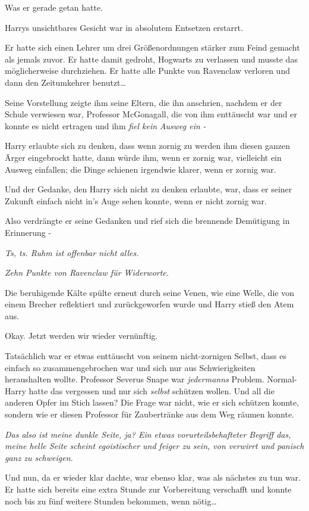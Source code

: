 {Was er gerade getan hatte.

Harrys unsichtbares Gesicht war in absolutem Entsetzen erstarrt.

Er hatte sich einen Lehrer um drei Größenordnungen stärker zum Feind gemacht als jemals zuvor. Er hatte damit gedroht, Hogwarts zu verlassen und musste das möglicherweise durchziehen. Er hatte alle Punkte von Ravenclaw verloren und dann den Zeitumkehrer benutzt…

Seine Vorstellung zeigte ihm seine Eltern, die ihn anschrien, nachdem er der Schule verwiesen war, Professor McGonagall, die von ihm enttäuscht war und er konnte es nicht ertragen und ihm \emph{fiel kein} \emph{Ausweg ein} \emph{-}

Harry erlaubte sich zu denken, dass wenn zornig zu werden ihm diesen ganzen Ärger eingebrockt hatte, dann würde ihm, wenn er zornig war, vielleicht ein Ausweg einfallen; die Dinge schienen irgendwie klarer, wenn er zornig war.

Und der Gedanke, den Harry sich nicht zu denken erlaubte, war, dass er seiner Zukunft einfach nicht in's Auge sehen konnte, wenn er nicht zornig war.

Also verdrängte er seine Gedanken und rief sich die brennende Demütigung in Erinnerung -

\emph{Ts, ts. Ruhm ist offenbar nicht alles.}

\emph{Zehn Punkte von Ravenclaw für Widerworte.}

Die beruhigende Kälte spülte erneut durch seine Venen, wie eine Welle, die von einem Brecher reflektiert und zurückgeworfen wurde und Harry stieß den Atem aus.

Okay. Jetzt werden wir wieder vernünftig.

Tatsächlich war er etwas enttäuscht von seinem nicht-zornigen Selbst, dass es einfach so zusammengebrochen war und sich nur aus Schwierigkeiten heraushalten wollte. Professor Severus Snape war \emph{jedermanns} Problem. Normal-Harry hatte das vergessen und nur sich \emph{selbst} schützen wollen. Und all die anderen Opfer im Stich lassen? Die Frage war nicht, wie er sich schützen konnte, sondern wie er diesen Professor für Zaubertränke aus dem Weg räumen konnte.

\emph{Das also ist meine dunkle Seite, ja? Ein etwas vorurteilsbehafteter Begriff das, meine helle Seite scheint egoistischer und feiger zu sein, von verwirrt und panisch ganz zu schweigen.}

Und nun, da er wieder klar dachte, war ebenso klar, was als nächstes zu tun war. Er hatte sich bereits eine extra Stunde zur Vorbereitung verschafft und konnte noch bis zu fünf weitere Stunden bekommen, wenn nötig…

}
